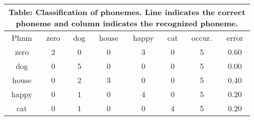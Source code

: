 \documentclass[10pt]{article}
\begin{document}
\tiny
\begin{tabular}{|@{}c@{}||@{}c@{}|@{}c@{}|@{}c@{}|@{}c@{}|@{}c@{}|@{}c@{}|@{}c@{}|}
\hline
\multicolumn{8}{c}{Table: Classification of phonemes. Line indicates the correct phoneme and column indicates the recognized phoneme.} \\ \hline \hline
Phnm & zero & dog & house & happy & cat & occur. & error \\ \hline
zero & 2 & 0 & 0 & 3 & 0 & 5 & 0.60 \\ \hline
dog & 0 & 5 & 0 & 0 & 0 & 5 & 0.00 \\ \hline
house & 0 & 2 & 3 & 0 & 0 & 5 & 0.40 \\ \hline
happy & 0 & 1 & 0 & 4 & 0 & 5 & 0.20 \\ \hline
cat & 0 & 1 & 0 & 0 & 4 & 5 & 0.20 \\ \hline
\end{tabular}
\end{document}
